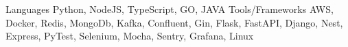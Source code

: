 \begin{cvskills}
  \cvskill
  {Languages}
  {Python, NodeJS, TypeScript, GO, JAVA}
  \cvskill
  {Tools/Frameworks}
  {AWS, Docker, Redis, MongoDb, Kafka, Confluent, Gin, Flask, FastAPI, Django, Nest, Express, PyTest, Selenium, Mocha, Sentry, Grafana, Linux}
\end{cvskills}